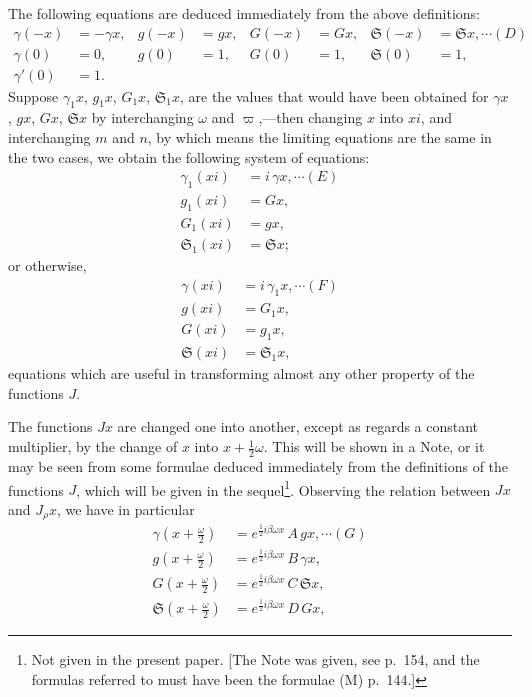 \documentclass[12pt,a4paper]{article}
\newcommand{\fS}{\mathfrak{S}}
\begin{document}
The following equations are deduced immediately from the above definitions:
\begin{align*}
\gamma(-x) &= -\gamma x, & g(-x) &= g x, & G(-x) &= G x, & \fS(-x) &= \fS x, \cdots(D)\\
\gamma(0) &= 0, & g(0) &= 1, & G(0) &= 1, & \fS(0) &= 1,\\
\gamma'(0) &= 1.
\end{align*}
Suppose $\gamma_1 x$, $g_1 x$, $G_1 x$, $\fS_1 x$, are the values that would have been obtained for $\gamma x$, $g x$, $G x$, $\fS x$ by interchanging $\omega$ and $\varpi$,---then changing $x$ into $x i$, and interchanging $m$ and $n$, by which means the limiting equations are the same in the two cases, we obtain the following system of equations:
\begin{align*}
\gamma_1(x i) &= i\,\gamma x, \cdots(E)\\
g_1(x i) &= G x,\\
G_1(x i) &= g x,\\
\fS_1(x i) &= \fS x;
\end{align*}
or otherwise,
\begin{align*}
\gamma(x i) &= i\,\gamma_1 x, \cdots(F)\\
g(x i) &= G_1 x,\\
G(x i) &= g_1 x,\\
\fS(x i) &= \fS_1 x,
\end{align*}
equations which are useful in transforming almost any other property of the functions $J$.

The functions $J x$ are changed one into another, except as regards a constant multiplier, by the change of $x$ into $x + \tfrac{1}{2}\omega$. This will be shown in a Note, or it may be seen from some formulae deduced immediately from the definitions of the functions $J$, which will be given in the sequel\footnote{Not given in the present paper. [The Note was given, see p.~154, and the formulas referred to must have been the formulae (M) p.~144.]}. Observing the relation between $J x$ and $J_\rho x$, we have in particular
\begin{align*}
\gamma\!\left(x + \tfrac{\omega}{2}\right) &= e^{\frac{1}{2}i\beta\omega x}\,A\,g x, \cdots(G)\\
g\!\left(x + \tfrac{\omega}{2}\right) &= e^{\frac{1}{2}i\beta\omega x}\,B\,\gamma x,\\
G\!\left(x + \tfrac{\omega}{2}\right) &= e^{\frac{1}{2}i\beta\omega x}\,C\,\fS x,\\
\fS\!\left(x + \tfrac{\omega}{2}\right) &= e^{\frac{1}{2}i\beta\omega x}\,D\,G x,
\end{align*}
\end{document}
